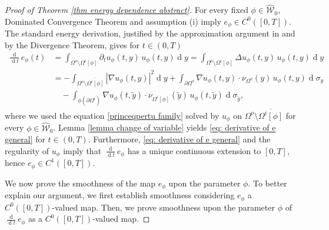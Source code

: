 \documentclass[11pt,reqno,a4paper]{amsart}
\theoremstyle{plain}
\theoremstyle{definition}
\renewcommand{\d}[1]{\ensuremath{\operatorname{d}\!{#1}}}
\begin{document}
\begin{proof}[Proof of Theorem \ref{thm energy dependence abstract}]
For every fixed $\phi \in \widehat{\mathcal{W}}_0$, Dominated Convergence Theorem and assumption (i) imply $e_\phi \in C^0([0,T])$. The standard energy derivation, justified by the approximation argument in \cite[Lem.\,5\,\&\,Prop.\,2]{Lu20} and by the Divergence Theorem, gives for $t\in(0,T)$
    \begin{equation*}
    \begin{aligned}
        \frac{\d{}}{\d t}e_\phi(t) &= \int_{\Omega^o \setminus \overline{\Omega^i[\phi]}} \partial_t u_\phi(t,y) \, u_\phi(t,y) \d y = \int_{\Omega^o \setminus \overline{\Omega^i[\phi]}} \Delta u_\phi(t,y) \, u_\phi(t,y) \d y 
        \\
        &= - \int_{\Omega^o \setminus \overline{\Omega^i[\phi]}} |\nabla u_\phi(t,y)|^2 \d y + \int_{\partial\Omega^o} 
        \nabla u_\phi(t,y)\cdot \nu_{\Omega^o}(y) \, u_{\phi}(t,y) \d \sigma_y 
        \\
        & \quad - \int_{\phi(\partial\Omega^i)} 
        \nabla u_\phi(t,\tilde{y}) \cdot \nu_{\Omega^i[\phi]}(\tilde{y})  \, u_{\phi}(t, \tilde{y}) \d \sigma_{\tilde{y}},
    \end{aligned}    
    \end{equation*}
    where we used the equation \eqref{princeqpertu family} solved by $u_\phi$ on $\Omega^o \setminus \overline{\Omega^i[\phi]}$ for every $\phi \in \widehat{\mathcal{W}}_0$. Lemma \ref{lemma change of variable} yields \eqref{eq: derivative of e general} for $t\in(0,T)$. Furthermore, \eqref{eq: derivative of e general} and the regularity of $u_\phi$ imply that $\frac{\d{}}{\d t}e_\phi$ has a unique continuous extension to $[0,T]$, hence $e_\phi \in C^1([0,T])$.

    We now prove the smoothness of the map $e_\phi$ upon the parameter $\phi$. To better explain our argument, we first establish smoothness considering $e_\phi$ a $C^0([0,T])$-valued map. Then, we prove smoothness upon the parameter $\phi$ of $\frac{\d{}}{\d t}e_\phi$ as a $C^0([0,T])$-valued map.


\end{proof}
\end{document}
